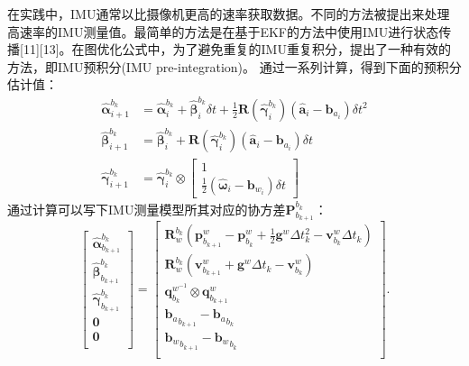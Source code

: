 \documentclass[cs4size,a4paper]{ctexart}
\numberwithin{equation}{section}
\numberwithin{table}{section}
\numberwithin{figure}{section}
\begin{document}
在实践中，IMU通常以比摄像机更高的速率获取数据。不同的方法被提出来处理高速率的IMU测量值。最简单的方法是在基于EKF的方法中使用IMU进行状态传播[11][13]。在图优化公式中，为了避免重复的IMU重复积分，提出了一种有效的方法，即IMU预积分(IMU pre-integration)。
通过一系列计算，得到下面的预积分估计值：
\begin{align} 
\hat{\boldsymbol{\alpha }}^{b_k}_{i+1} &= \hat{\boldsymbol{\alpha }}^{b_k}_i + \hat{\boldsymbol{\beta }}^{b_k}_i\delta t + \frac{1}{2} \mathbf {R}(\hat{\boldsymbol{\gamma }}^{b_k}_i)(\hat{\mathbf {a}}_i - \mathbf {b}_{a_i}) \delta t^2 \nonumber\\ \hat{\boldsymbol{\beta }}^{b_k}_{i+1} &= \hat{\boldsymbol{\beta }}^{b_k}_{i} + \mathbf {R}(\hat{\boldsymbol{\gamma }}^{b_k}_i)(\hat{\mathbf {a}}_i - \mathbf {b}_{a_i})\delta t\nonumber\\ \hat{\boldsymbol{\gamma }}^{b_k}_{i+1} &= \hat{\boldsymbol{\gamma }}^{b_k}_i \otimes {\left[\begin{array}{c}1\\ \frac{1}{2} (\hat{\boldsymbol{\omega }}_i- \mathbf {b}_{w_i})\delta t \end{array}\right]}
\end{align}
通过计算可以写下IMU测量模型所其对应的协方差${\mathbf {P}^{b_k}_{b_{k+1}}}$：
\begin{equation} 
{\left[\begin{array}{c}\hat{\boldsymbol{\alpha }}^{b_k}_{b_{k+1}}\\ \hat{\boldsymbol{\beta }}^{b_k}_{b_{k+1}}\\ \hat{\boldsymbol{\gamma }}^{b_k}_{b_{k+1}}\\ \mathbf {0}\\ \mathbf {0}\\ \end{array}\right]} = {\left[\begin{array}{c}\mathbf {R}^{b_k}_{w}(\mathbf {p}^{w}_{b_{k+1}} - \mathbf {p}^{w}_{b_k} + \frac{1}{2}\mathbf {g}^{w} \Delta t_k^2 - \mathbf {v}^{w}_{b_k} \Delta t_k) \\ \mathbf {R}^{b_k}_{w}(\mathbf {v}^{w}_{b_{k+1}} + \mathbf {g}^{w} \Delta t_k- \mathbf {v}^{w}_{b_k}) \\ \mathbf {q}^{w^{-1}}_{b_{k}} \otimes \mathbf {q}^{w}_{b_{k+1}}\\ {\mathbf {b}_a}_{b_{k+1}} - {\mathbf {b}_a}_{b_k}\\ {\mathbf {b}_w}_{b_{k+1}} -{\mathbf {b}_w}_{b_k}\\ \end{array}\right]}.
\end{equation}
\end{document}
